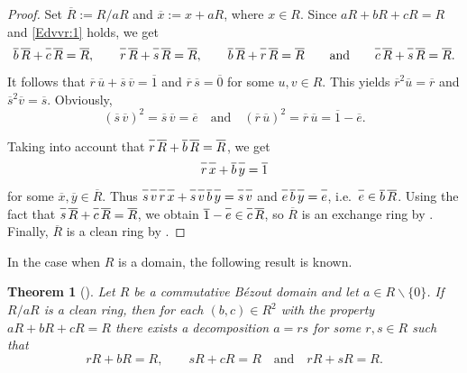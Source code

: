 \documentclass[10pt,a4paper]{amsart}
\theoremstyle{plain}
\newtheorem{theorem}{Theorem}
\theoremstyle{definition}
\begin{document}
\begin{proof}
Set $\overline{R}:=R/aR$ and $\overline{x}:=x+aR$, where $x\in R$. Since  $aR+bR+cR=R$ and \eqref{Edvvr:1} holds, we get
\[
\overline{b}\,\overline{R\vphantom{b}}+\overline{c\vphantom{b}}\,\overline{R\vphantom{b}}=\overline{R\vphantom{b}},
\qquad
\overline{r\vphantom{b}}\,\overline{R\vphantom{b}}+\overline{s\vphantom{b}}\,\overline{R\vphantom{b}}=\overline{R\vphantom{b}},
\qquad
\overline{b}\,\overline{R\vphantom{b}}+\overline{r\vphantom{b}}\,\overline{R\vphantom{b}}=\overline{R\vphantom{b}}
\qquad
\text{and}
\qquad
\overline{c\vphantom{b}}\,\overline{R\vphantom{b}}+\overline{s\vphantom{b}}\,\overline{R\vphantom{b}}=\overline{R\vphantom{b}}.
\]
It follows that  $\overline{r}\,\overline{u}+\overline{s}\,\overline{v}=\overline{1}$ and $\overline{r}\,\overline{s}=\overline{0}$ for some $u,v\in R$. This yields  $\overline{r}^2\overline{u}=\overline{r}$ and  $\overline{s}^2\overline{v}=\overline{s}$. Obviously,
\[
(\overline{s}\,\overline{v})^2=\overline{s}\,\overline{v}=\overline{e}\quad\text{and} \quad  (\overline{r}\,\overline{u})^2=\overline{r}\,\overline{u}=\overline{1}-\overline{e}.
\]


\smallskip

\noindent
Taking into account that  $\overline{r\vphantom{b}}\,\overline{R\vphantom{b}}+\overline{b}\,\overline{R\vphantom{b}}=\overline{R\vphantom{b}}$,
we get
\[
\overline{r\vphantom{b}}\,\overline{x\vphantom{b}}+\overline{b}\,\overline{y\vphantom{b}}=\overline{1\vphantom{b}}
\]
for some $\overline{x},\overline{y}\in \overline{R}$.
Thus
$\overline{s\vphantom{b}}\,\overline{v\vphantom{b}}\,\overline{r\vphantom{b}}\,\overline{x\vphantom{b}}
+\overline{s\vphantom{b}}\,\overline{v\vphantom{b}}\,\overline{b}\,\overline{y\vphantom{b}}
=\overline{s\vphantom{b}}\,\overline{v\vphantom{b}}$ and
$\overline{e\vphantom{b}}\,\overline{b}\,\overline{y\vphantom{b}}=\overline{e\vphantom{b}}$,
i.e.~$\overline{e\vphantom{b}}\in \overline{b}\,\overline{R\vphantom{b}}$.
Using the fact that  $\overline{s\vphantom{R}}\,\overline{R}+\overline{c\vphantom{R}}\,\overline{R}=\overline{R}$,
we obtain   $\overline{1}-\overline{e\vphantom{R}}\in \overline{c\vphantom{R}}\,\overline{R}$, so  $\overline{R}$ is an exchange ring  by \cite[Proposition 1.1 and Theorem 2.1]{7-kaplansky}.  Finally,  $\overline{R}$ is a clean ring by \cite[p.\,244]{6-mcGovern}.
\end{proof}

In the case when $R$ is a domain,  the following result  is known.

\begin{theorem}[{\!\!\cite[Theorem 31]{9-zabavsky}}]\label{T:6}
Let $R$ be a commutative B\'ezout domain and let $a\in R\backslash\{0\}$. If $R/aR$ is a clean ring,  then for  each $(b,c)\in R^2$ with the property $aR+bR+cR=R$ there exists  a decomposition $a=rs$  for some $r,s\in R$ such that
\[
rR+bR=R,\qquad   sR+cR=R\quad \text{and}\quad  rR+sR=R.
\]
\end{theorem}
\end{document}
